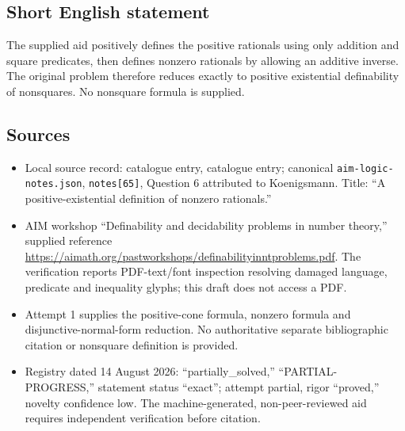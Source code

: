 \documentclass[11pt]{article}
\begin{document}
\subsection{Short English statement}
The supplied aid positively defines the positive rationals using only addition and square predicates, then defines nonzero rationals by allowing an additive inverse. The original problem therefore reduces exactly to positive existential definability of nonsquares. No nonsquare formula is supplied.
\subsection{Sources}
\begin{itemize}
\item Local source record: catalogue entry, catalogue entry; canonical \texttt{aim-logic-notes.json}, \texttt{notes[65]}, Question 6 attributed to Koenigsmann. Title: ``A positive-existential definition of nonzero rationals.''
\item AIM workshop ``Definability and decidability problems in number theory,'' supplied reference \url{https://aimath.org/pastworkshops/definabilityinntproblems.pdf}. The verification reports PDF-text/font inspection resolving damaged language, predicate and inequality glyphs; this draft does not access a PDF.
\item Attempt 1 supplies the positive-cone formula, nonzero formula and disjunctive-normal-form reduction. No authoritative separate bibliographic citation or nonsquare definition is provided.
\item Registry dated 14 August 2026: ``partially\_solved,'' ``PARTIAL-PROGRESS,'' statement status ``exact''; attempt partial, rigor ``proved,'' novelty confidence low. The machine-generated, non-peer-reviewed aid requires independent verification before citation.
\end{itemize}
\end{document}
